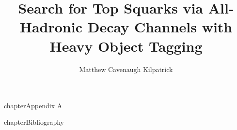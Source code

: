 \documentclass[12pt]{ruthesis}
\title{Search for Top Squarks via All-Hadronic Decay Channels with Heavy Object Tagging}
\author{Matthew Cavenaugh Kilpatrick}
\begin{document}
  \begin{frontmatter}
   \makecover
   \maketitle
   
   \tableofcontents
   \listoffigures
   \listoftables
%   
  \end{frontmatter}










\appendix
{} {chapter}{\numberline {}Appendix A}


%
 {chapter}{\numberline {}Bibliography}{}



%

\end{document}
